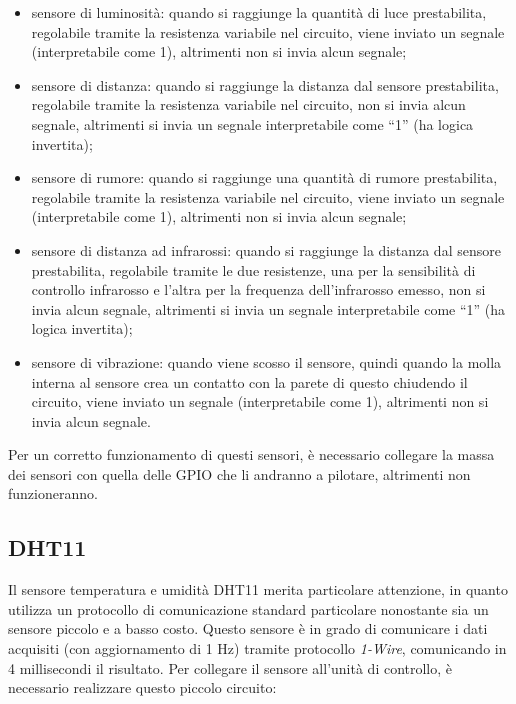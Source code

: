 \documentclass[a4paper,titlepage]{book}
\newcommand{\itema}{\begin{itemize}[noitemsep,topsep=10pt,parsep=23pt,partopsep=0pt]}
\begin{document}
\itema

\item sensore di luminosità: quando si raggiunge la quantità di luce prestabilita, regolabile tramite la resistenza variabile nel circuito, viene inviato un segnale (interpretabile come 1), altrimenti non si invia alcun segnale;

\item sensore di distanza: quando si raggiunge la distanza dal sensore prestabilita, regolabile tramite la resistenza variabile nel circuito, non si invia alcun segnale, altrimenti si invia un segnale interpretabile come ``1'' (ha logica invertita);

\item sensore di rumore: quando si raggiunge una quantità di rumore prestabilita, regolabile tramite la resistenza variabile nel circuito, viene inviato un segnale (interpretabile come 1), altrimenti non si invia alcun segnale;

\item sensore di distanza ad infrarossi: quando si raggiunge la distanza dal sensore prestabilita, regolabile tramite le due resistenze, una per la sensibilità di controllo infrarosso e l'altra per la frequenza dell'infrarosso emesso, non si invia alcun segnale, altrimenti si invia un segnale interpretabile come ``1'' (ha logica invertita);

\item sensore di vibrazione: quando viene scosso il sensore, quindi quando la molla interna al sensore crea un contatto con la parete di questo chiudendo il circuito, viene inviato un segnale (interpretabile come 1), altrimenti non si invia alcun segnale.

\end{itemize} 


Per un corretto funzionamento di questi sensori, è necessario collegare la massa dei sensori con quella delle GPIO che li andranno a pilotare, altrimenti non funzioneranno.

\subsection{DHT11}

Il sensore temperatura e umidità DHT11 merita particolare attenzione, in quanto utilizza un protocollo di comunicazione standard particolare nonostante sia un sensore piccolo e a basso costo. Questo sensore è in grado di comunicare i dati acquisiti (con aggiornamento di 1 Hz) tramite protocollo \textit{1-Wire}, comunicando in 4 millisecondi il risultato. Per collegare il sensore all'unità di controllo, è necessario realizzare questo piccolo circuito:
\end{document}
